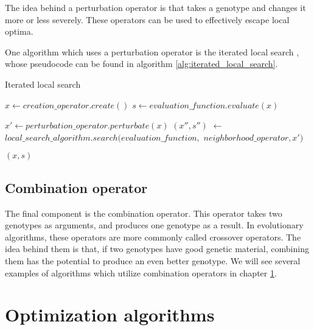 The idea behind a perturbation operator is that takes a genotype and changes it more or less severely. These operators can be used to effectively escape local optima.

One algorithm which uses a perturbation operator is the iterated local search \citep{iterated_local_search}, whose pseudocode can be found in algorithm \ref{alg:iterated_local_search}. 

\begin{algorithm}[!htbp]
    \caption{Iterated local search}
    \label{alg:iterated_local_search}

    $x \gets creation\_operator.create()$\;
    $s \gets evaluation\_function.evaluate(x)$\;

     {
        $x' \gets perturbation\_operator.perturbate(x)$\;
        $(x'', s'')$ $\gets$ $local\_search\_algorithm.search($$evaluation\_function,$ \newline \hspace*{1em} $ neighborhood\_operator, x')$\;
    }

    \Return $(x, s)$\;
    \end{algorithm}

\subsection{Combination operator}
\label{sec:combinatino_operator}

The final component is the combination operator. This operator takes two genotypes as arguments, and produces one genotype as a result. In evolutionary algorithms, these operators are more commonly called crossover operators. The idea behind them is that, if two genotypes have good genetic material, combining them has the potential to produce an even better genotype. We will see several examples of algorithms which utilize combination operators in chapter \ref{sec:optimization_algorithms}.

\section{Optimization algorithms}
\label{sec:optimization_algorithms}

